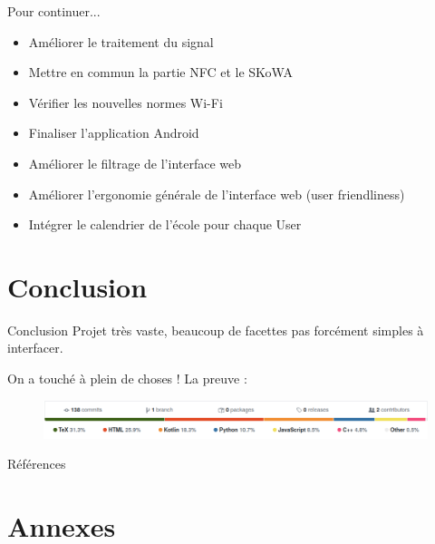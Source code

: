 \documentclass[aspectratio=169]{beamer}
\begin{document}
\begin{frame}{Pour continuer...}

  \begin{itemize}
    \item Améliorer le traitement du signal
    \item Mettre en commun la partie NFC et le SKoWA
    \item Vérifier les nouvelles normes Wi-Fi
    \item Finaliser l'application Android
    \item Améliorer le filtrage de l'interface web
    \item Améliorer l'ergonomie générale de l'interface web (user friendliness)
    \item Intégrer le calendrier de l'école pour chaque User
  \end{itemize}  

\end{frame}

\section{Conclusion}

\begin{frame}{Conclusion}
  Projet très vaste, beaucoup de facettes pas forcément simples à interfacer.
  
  \bigskip
  
  On a touché à plein de choses ! La preuve :
  \begin{figure}
    \centering
    \includegraphics[width=\textwidth]{../assets/languages.png}
  \end{figure}
\end{frame}

\begin{frame}{Références}
  \printbibliography
\end{frame}


\section*{Annexes}
\end{document}
